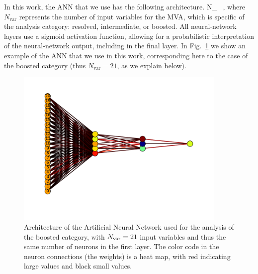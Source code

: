 In this work, the ANN that we use has the following architecture.
\be
\label{eq:nn1}
N_{} \, ,
\ee
where $N_{\mathrm{var}}$ represents the number of input variables for the MVA,
which is specific of the analysis category: resolved, intermediate, or boosted.
%
All neural-network layers use a sigmoid activation function, allowing
for a probabilistic
interpretation of the neural-network output, including in the final layer.
%
In Fig.~\ref{fig:nnarch} we show an example of the ANN that we use in this work, corresponding here
to the case of the boosted category (thus $N_{\mathrm{var}}=21$, as we explain below).

\begin{figure}[t]
  \begin{center}
      \vspace{-1cm}
  \includegraphics[width=0.90\textwidth]{plots/bst_nnarch_noPU.pdf}
  \vspace{-2cm}
  \caption{\small Architecture of the Artificial
    Neural Network
    used for the analysis of the
    boosted
    category, with $N_{\rm var}=21$ input variables and thus
    the same number of neurons
  in the first layer.
  The color code in the neuron connections (the weights) is a heat map,
  with red indicating large values and black small values.
}
\label{fig:nnarch}
\end{center}
\end{figure}

